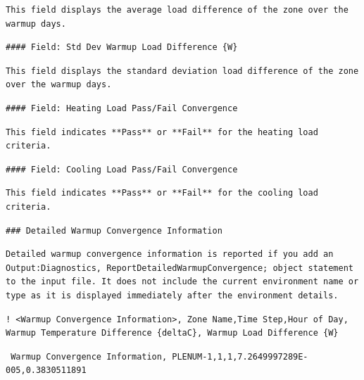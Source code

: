 \begin{lstlisting}
This field displays the average load difference of the zone over the warmup days.
\end{lstlisting}

\begin{lstlisting}
#### Field: Std Dev Warmup Load Difference {W}
\end{lstlisting}

\begin{lstlisting}
This field displays the standard deviation load difference of the zone over the warmup days.
\end{lstlisting}

\begin{lstlisting}
#### Field: Heating Load Pass/Fail Convergence
\end{lstlisting}

\begin{lstlisting}
This field indicates **Pass** or **Fail** for the heating load criteria.
\end{lstlisting}

\begin{lstlisting}
#### Field: Cooling Load Pass/Fail Convergence
\end{lstlisting}

\begin{lstlisting}
This field indicates **Pass** or **Fail** for the cooling load criteria.
\end{lstlisting}

\begin{lstlisting}
### Detailed Warmup Convergence Information
\end{lstlisting}

\begin{lstlisting}
Detailed warmup convergence information is reported if you add an Output:Diagnostics, ReportDetailedWarmupConvergence; object statement to the input file. It does not include the current environment name or type as it is displayed immediately after the environment details.
\end{lstlisting}

\begin{lstlisting}
! <Warmup Convergence Information>, Zone Name,Time Step,Hour of Day, Warmup Temperature Difference {deltaC}, Warmup Load Difference {W}
\end{lstlisting}

\begin{lstlisting}
 Warmup Convergence Information, PLENUM-1,1,1,7.2649997289E-005,0.3830511891
\end{lstlisting}

